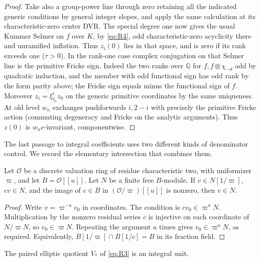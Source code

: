 \begin{proof}
Take also a group-power line through zero retaining all the indicated generic conditions by general integer slopes, and apply the same calculation at its characteristic-zero center DVR. The special degree one now gives the usual Kummer Selmer on \(f\) over \(K\), by \eqref{eq:R4}, odd characteristic-zero acyclicity there and unramified inflation. Thus \(z_i(0)\) lies in that space, and is zero if its rank exceeds one (\(\tau>0\)). In the rank-one case complex conjugation on that Selmer line is the primitive Fricke sign. Indeed the two ranks over \(\mathbb Q\) for \(f,f\otimes\chi_{-d}\) add by quadratic induction, and the member with odd functional sign has odd rank by the form parity above; the Fricke sign equals minus the functional sign of \(f\). Moreover \(z_i=\xi_{\ell_0}^i z_0\) on the generic primitive coordinates by the same uniqueness. At old level \(w_n\) exchanges pushforwards \(i,2-i\) with precisely the primitive Fricke action (commuting degeneracy and Fricke on the analytic arguments). Thus \(z(0)\) is \(w_nc\)-invariant, componentwise.
\end{proof}

The last passage to integral coefficients uses two different kinds
of denominator control. We record the elementary intersection that
combines them.

\begin{lemma}\label{real:denominator-intersection}
Let \(\mathcal O\) be a discrete valuation ring of residue
characteristic two, with uniformizer \(\varpi\), and let
\(B=\mathcal O[[u]]\). Let \(N\) be a finite free \(B\)-module.
If \(v\in N[1/\varpi]\), \(cv\in N\), and the image of
\(c\in B\) in \((\mathcal O/\varpi)[[u]]\) is nonzero, then
\(v\in N\).
\end{lemma}

\begin{proof}
Write \(v=\varpi^{-a}v_0\) in coordinates. The condition is
\(cv_0\in\varpi^aN\). Multiplication by the nonzero residual
series \(\overline c\) is injective on each coordinate of
\(N/\varpi N\), so \(v_0\in\varpi N\). Repeating the argument
\(a\) times gives \(v_0\in\varpi^aN\), as required. Equivalently,
\(B[1/\varpi]\cap B[1/c]=B\) in its fraction field.
\end{proof}

\begin{proposition}\label{real:primitivity}
The paired elliptic quotient \(V_*\) of \eqref{eq:R3} is an integral
unit.
\end{proposition}

